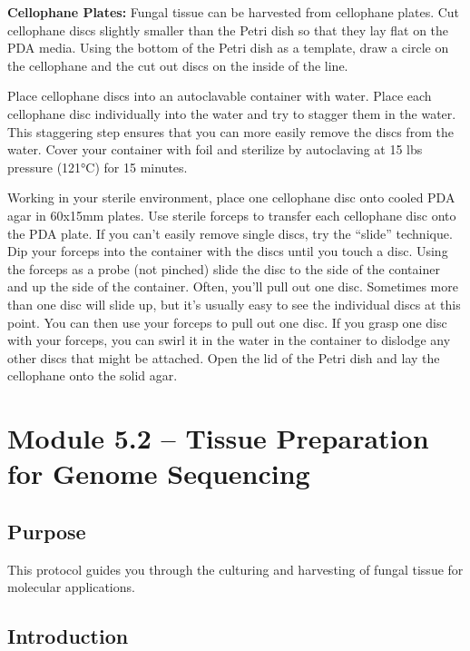 \documentclass[
  letterpaper,
  DIV=11,
  numbers=noendperiod]{scrreprt}
\begin{document}
\textbf{Cellophane Plates:} Fungal tissue can be harvested from
cellophane plates. Cut cellophane discs slightly smaller than the Petri
dish so that they lay flat on the PDA media. Using the bottom of the
Petri dish as a template, draw a circle on the cellophane and the cut
out discs on the inside of the line.

Place cellophane discs into an autoclavable container with water. Place
each cellophane disc individually into the water and try to stagger them
in the water. This staggering step ensures that you can more easily
remove the discs from the water. Cover your container with foil and
sterilize by autoclaving at 15 lbs pressure (121°C) for 15 minutes.

Working in your sterile environment, place one cellophane disc onto
cooled PDA agar in 60x15mm plates. Use sterile forceps to transfer each
cellophane disc onto the PDA plate. If you can't easily remove single
discs, try the ``slide'' technique. Dip your forceps into the container
with the discs until you touch a disc. Using the forceps as a probe (not
pinched) slide the disc to the side of the container and up the side of
the container. Often, you'll pull out one disc. Sometimes more than one
disc will slide up, but it's usually easy to see the individual discs at
this point. You can then use your forceps to pull out one disc. If you
grasp one disc with your forceps, you can swirl it in the water in the
container to dislodge any other discs that might be attached. Open the
lid of the Petri dish and lay the cellophane onto the solid agar.

\section*{Module 5.2 -- Tissue Preparation for Genome
Sequencing}\label{module-5.2-tissue-preparation-for-genome-sequencing}


\subsection*{Purpose}\label{purpose-3}

This protocol guides you through the culturing and harvesting of fungal
tissue for molecular applications.

\subsection*{Introduction}\label{introduction-4}
\end{document}
